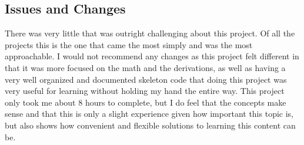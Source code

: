 \documentclass[a4paper, 11pt]{article}
\begin{document}
\subsection{Issues and Changes}
\label{sec:org9559c37}
There was very little that was outright challenging about this project. Of all the projects this is the one that came the most simply and was the most approachable. I would not recommend any changes as this project felt different in that it was more focused on the math and the derivations, as well as having a very well organized and documented skeleton code that doing this project was very useful for learning without holding my hand the entire way.
This project only took me about 8 hours to complete, but I do feel that the concepts make sense and that this is only a slight experience given how important this topic is, but also shows how convenient and flexible solutions to learning this content can be.
\end{document}
